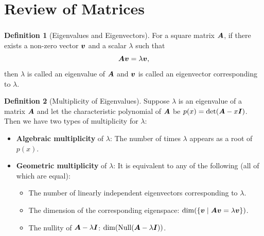 \documentclass[10pt,UTF8]{article}
\renewcommand*{\vec}{\vectorsym}
\newcommand{\mat}[1]{\matrixsym{#1}}
\newenvironment{definitionBox}
{
  \begin{tcolorbox}[colback=blue!5!white,colframe=blue!75!black,parbox=false,before
  upper=\par,before lower=\par]}
  {
\end{tcolorbox}}
\theoremstyle{definition}
\newtheorem{definition inner}{Definition}[section]
\newenvironment{definition}[1][]
{
  \begin{definitionBox}
  \begin{definition inner}[#1]\hfill\par}
    {
    \end{definition inner}
\end{definitionBox}}
\theoremstyle{definition}
\newtheorem{theorem inner}{Theorem}[section]
\theoremstyle{definition}
\newtheorem*{proof inner}{\textit{Proof}}
\theoremstyle{plain}
\newtheorem{tip inner}{Tip}[section]
\theoremstyle{remark}
\DeclareMathOperator{\Null}{Null}  %
\begin{document}
\part*{Review of Matrices}

\section{}


\begin{definition}[Eigenvalues and Eigenvectors]
  For a square matrix \(\mat{A}\), if there exists a non-zero vector \(\vec{v}\)
  and a scalar \(\lambda \) such that
  \[
    \mat{A}\vec{v} = \lambda\vec{v},
  \]
  then \(\lambda \) is called an eigenvalue of \(\mat{A}\) and
  \(\vec{v}\) is called an eigenvector corresponding to \(\lambda \).
\end{definition}

\begin{definition}[Multiplicity of Eigenvalues]
  Suppose \(\lambda \) is an eigenvalue of a matrix \(\mat{A}\) and let the
  characteristic polynomial of \(\mat{A}\) be \(p(x) = \det(\mat{A} - x \mat{I})\).
  Then we have two types of multiplicity for \(\lambda \):
  \begin{itemize}
    \item \textbf{Algebraic multiplicity} of \(\lambda \):
      The number of times \(\lambda \) appears as a root of \(p(x)\).
    \item \textbf{Geometric multiplicity} of \(\lambda \):
      It is equivalent to any of the following (all of which are equal):
      \begin{itemize}
        \item The number of linearly independent eigenvectors
          corresponding to \(\lambda \).
        \item The dimension of the corresponding eigenspace:
          \( \dim(\{\vec{v} \mid \mat{A}\vec{v} = \lambda\vec{v}\}) \).
        \item The nullity of \(\mat{A} - \lambda \mat{I}\):
          \( \dim(\Null(\mat{A} - \lambda \mat{I})) \).
      \end{itemize}
  \end{itemize}
\end{definition}
\end{document}
